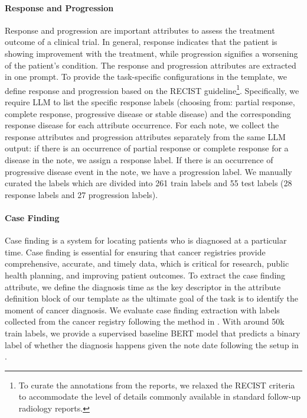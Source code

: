 \paragraph{Response and Progression}
Response and progression are important attributes to assess the treatment outcome of a clinical trial. In general, response indicates that the patient is showing improvement with the treatment, while progression signifies a worsening of the patient's condition. The response and progression attributes are extracted in one prompt. To provide the task-specific configurations in the template, we define response and progression based on the RECIST guideline\citep{nishino2010revised}\footnote{To curate the annotations from the reports, we relaxed the RECIST criteria to accommodate the level of details commonly available in standard follow-up radiology reports.}. Specifically, we require \ac{LLM} to list the specific response labels (choosing from: partial response, complete response, progressive disease or stable disease) and the corresponding response disease for each attribute occurrence. For each note, we collect the response attributes and progression attributes separately from the same \ac{LLM} output: if there is an occurrence of partial response or complete response for a disease in the note, we assign a response label. If there is an occurrence of progressive disease event in the note, we have a progression label. We manually curated the labels which are divided into 261 train labels and 55 test labels (28 response labels and 27 progression labels).




\paragraph{Case Finding}
Case finding is a system for locating patients who is diagnosed at a particular time. Case finding is essential for ensuring that cancer registries provide comprehensive, accurate, and timely data, which is critical for research, public health planning, and improving patient outcomes. To extract the case finding attribute, we define the diagnosis time as the key descriptor in the attribute definition block of our template as the ultimate goal of the task is to identify the moment of cancer diagnosis. We evaluate case finding extraction with labels collected from the cancer registry following the method in \citet{preston2023toward}. With around 50k  train labels, we provide a supervised baseline BERT model that predicts a binary label of whether the diagnosis happens given the note date following the setup in \citet{preston2023toward}. 



